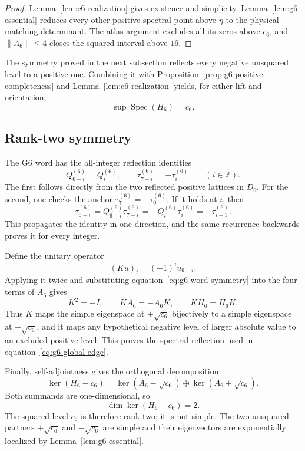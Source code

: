 \begin{proof}
Lemma~\ref{lem:c6-realization} gives existence and simplicity.
Lemma~\ref{lem:g6-essential} reduces every other positive spectral point
above \(\eta\) to the physical matching determinant. The atlas argument
excludes all its zeros above \(c_6\), and
\(\|A_6\|\leq4\) closes the squared interval above \(16\).
\end{proof}

The symmetry proved in the next subsection reflects every negative
unsquared level to a positive one.  Combining it with
Proposition~\ref{prop:g6-positive-completeness} and
Lemma~\ref{lem:c6-realization} yields, for either lift and orientation,
\begin{equation}\label{eq:g6-global-edge}
\sup\operatorname{Spec}(H_6)=c_6.
\end{equation}

\subsection{Rank-two symmetry}
\label{subsec:rank-two-symmetry}

The G6 word has the all-integer reflection identities
\begin{equation}\label{eq:g6-word-symmetry}
Q_{6-i}^{(6)}=Q_i^{(6)},\qquad
\tau_{7-i}^{(6)}=-\tau_i^{(6)}
\qquad(i\in\mathbb Z).
\end{equation}
The first follows directly from the two reflected positive lattices in
\(D_6\).  For the second, one checks the anchor
\(\tau_7^{(6)}=-\tau_0^{(6)}\).  If it holds at \(i\), then
\[
\tau_{6-i}^{(6)}
=Q_{6-i}^{(6)}\tau_{7-i}^{(6)}
=-Q_i^{(6)}\tau_i^{(6)}
=-\tau_{i+1}^{(6)}.
\]
This propagates the identity in one direction, and the same recurrence
backwards proves it for every integer.

Define the unitary operator
\[
(Ku)_i=(-1)^iu_{9-i}.
\]
Applying it twice and substituting
equation~\eqref{eq:g6-word-symmetry} into the four terms of \(A_6\) gives
\[
K^2=-I,\qquad KA_6=-A_6K,\qquad KH_6=H_6K.
\]
Thus \(K\) maps the simple eigenspace at \(+\sqrt{c_6}\) bijectively to a
simple eigenspace at \(-\sqrt{c_6}\), and it maps any hypothetical negative
level of larger absolute value to an excluded positive level.  This proves
the spectral reflection used in equation~\eqref{eq:g6-global-edge}.

Finally, self-adjointness gives the orthogonal decomposition
\[
\ker(H_6-c_6)
=\ker(A_6-\sqrt{c_6})\oplus\ker(A_6+\sqrt{c_6}).
\]
Both summands are one-dimensional, so
\[
\dim\ker(H_6-c_6)=2.
\]
The squared level \(c_6\) is therefore rank two; it is not simple.  The two
unsquared partners \(+\sqrt{c_6}\) and \(-\sqrt{c_6}\) are simple and their
eigenvectors are exponentially localized by Lemma~\ref{lem:g6-essential}.
